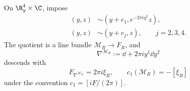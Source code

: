 \begin{proposition}
\label{prop:s6cusp-su2-null-clutch}
On \(\R^4_y\times\C\), impose
\begin{align}
 (y,z)&\sim(y+e_1,e^{-2\pi i y^2}z),
 \label{eq:s6cusp-decomposable-line-clutch}\\
 (y,z)&\sim(y+e_j,z),\qquad j=2,3,4.
 \label{eq:s6cusp-decomposable-line-trivial-clutches}
\end{align}
The quotient is a line bundle \(\mathcal M_R\to F_R\), and
\begin{equation}\label{eq:s6cusp-decomposable-line-connection}
 \nabla^{\mathcal M_R}:=\dd+2\pi i y^1\dd y^2
\end{equation}
descends with
\begin{equation}\label{eq:s6cusp-decomposable-line-curvature}
 F_{\nabla^{\mathcal M_R}}=2\pi i\xi_R,
 \qquad
 c_1(\mathcal M_R)=-[\xi_R]
\end{equation}
under the convention \(c_1=[iF/(2\pi)]\).


\end{proposition}
